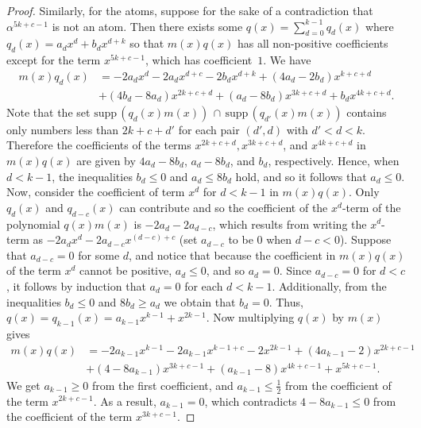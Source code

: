 \documentclass[10pt,a4paper]{amsart}
\newcommand{\supp}{\text{supp}\,}
\begin{document}
\begin{proof}
    Similarly, for the atoms, suppose for the sake of a contradiction that $\alpha^{5k+c-1}$ is not an atom. Then there exists some $q(x)=\sum_{d=0}^{k-1}q_d(x)$ where $q_d(x)=a_dx^d+b_dx^{d+k}$ so that $m(x)q(x)$ has all non-positive coefficients except for the term $x^{5k+c-1}$, which has coefficient~$1$. We have
    \begin{align*}
    		m(x)q_d(x) &= -2a_dx^d-2a_dx^{d+c}-2b_dx^{d+k}+(4a_d-2b_d)x^{k+c+d} \\
    							&+(4b_d-8a_d)x^{2k+c+d}+(a_d-8b_d)x^{3k+c+d}+b_dx^{4k+c+d}.
    \end{align*}
	Note that the set $\supp(q_d(x)m(x))\,\cap\,\supp(q_{d'}(x)m(x))$ contains only numbers less than $2k+c+d'$  for each pair $(d',d)$ with $d'<d<k$. Therefore the coefficients of the terms $x^{2k+c+d}, x^{3k+c+d}$, and $x^{4k+c+d}$ in $m(x)q(x)$ are given by $4a_d-8b_d$, $a_d-8b_d$, and $b_d$, respectively. Hence, when $d<k-1$, the inequalities $b_d \le 0$ and $a_d \le 8b_d$ hold, and so it follows that $a_d \le 0$. Now, consider the coefficient of term $x^d$ for $d<k-1$ in $m(x)q(x)$. Only $q_d(x)$ and $q_{d-c}(x)$ can contribute and so the coefficient of the $x^d$-term of the polynomial $q(x)m(x)$ is $-2a_d - 2a_{d-c}$, which results from writing the $x^d$-term as $-2a_dx^d - 2a_{d-c}x^{(d-c) + c}$ (set $a_{d-c}$ to be $0$ when $d-c < 0$). Suppose that $a_{d-c}=0$ for some $d$, and notice that because the coefficient in $m(x)q(x)$ of the term $x^d$ cannot be positive, $a_d \le 0$, and so $a_d = 0$. Since $a_{d-c}=0$ for $d<c$, it follows by induction that $a_d = 0$ for each $d<k-1$. Additionally, from the inequalities $b_d\le 0$ and $8b_d \ge a_d$ we obtain that $b_d = 0$. Thus, $q(x) = q_{k-1}(x) = a_{k-1}x^{k-1}+x^{2k-1}$. Now multiplying $q(x)$ by $m(x)$ gives 
    \begin{align*}
    	m(x)q(x) &=-2a_{k-1}x^{k-1}-2a_{k-1}x^{{k-1}+c}-2x^{{2k-1}}+(4a_{k-1}-2)x^{{2k+c}-1} \\
    					&+(4-8a_{k-1})x^{3k+c-1}+(a_{k-1}-8)x^{4k+c-1}+x^{5k+c-1}.
    \end{align*}
	We get $a_{k-1} \ge 0$ from the first coefficient, and $a_{k-1}\le\frac12$ from the coefficient of the term $x^{2k+c-1}$. As a result, $a_{k-1} = 0$, which contradicts $4 - 8a_{k-1} \le 0$ from the coefficient of the term $x^{3k+c-1}$.
\end{proof}
\end{document}
